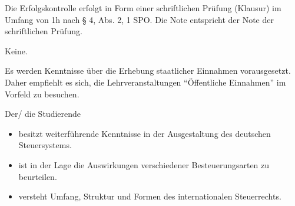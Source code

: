 \begin{course}

\setdoclanguagegerman
{}



\coursehead


\label{cour_10165.dp_997}


\begin{styleenv}
\begin{assessment}
Die Erfolgskontrolle erfolgt in Form einer schriftlichen Prüfung (Klausur) im Umfang von 1h nach § 4, Abs. 2, 1 SPO. Die Note entspricht der Note der schriftlichen Prüfung.


\end{assessment}

\begin{conditions}Keine.\end{conditions}

\begin{recommendations}Es werden Kenntnisse über die Erhebung staatlicher Einnahmen vorausgesetzt. Daher empfiehlt es sich, die Lehrveranstaltungen “Öffentliche Einnahmen” im Vorfeld zu besuchen.

\end{recommendations}
\end{styleenv}

\begin{learningoutcomes}
Der/ die Studierende

 \begin{itemize}\item besitzt weiterführende Kenntnisse in der Ausgestaltung des deutschen Steuersystems.  \item ist in der Lage die Auswirkungen verschiedener Besteuerungsarten zu beurteilen.  \item versteht Umfang, Struktur und Formen des internationalen Steuerrechts.  \end{itemize}
\end{learningoutcomes}


\end{course}
